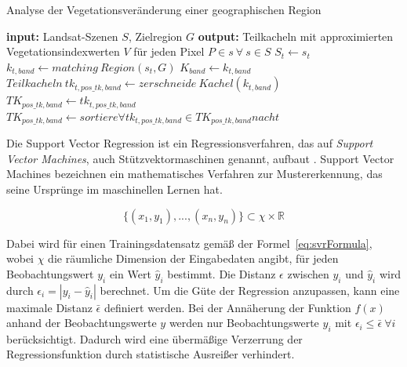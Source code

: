 \begin{algorithm}[H]
\small
\caption{Analyse der Vegetationsveränderung einer geographischen Region}
\label{alg:generalAlgorithm}
\begin{algorithmic}[1]
	\State \textbf{input:} Landsat-Szenen $S$, Zielregion $G$
	\State \textbf{output:} Teilkacheln mit approximierten Vegetationsindexwerten $V$ für jeden Pixel $P \in s\ \forall\ s \in S$
        		\State $S_t \leftarrow s_t $ \label{alg:groupOriginalScenes}
	\EndFor
	 \label{alg:dataCubeCreation}
			\State $k_{t, band} \leftarrow matching\ Region (s_t, G)$ \label{alg:cutAllTilesOfAGroup}
			\State $K_{band} \leftarrow k_{t, band}$ \label{alg:groupTiles}
		\EndFor
	\EndFor
	 \label{alg:flatMapOperator}
		\State $Teilkacheln\ tk_{t, pos\_tk, band} \leftarrow zerschneide\ Kachel (k_{t, band})$ \label{alg:sliceAllTiles}
		\State $TK_{pos\_tk, band} \leftarrow tk_{t, pos\_tk, band}$ \label{alg:groupSubscenes}
	\EndFor
		\State $TK_{pos\_tk, band} \leftarrow sortiere \forall tk_{t, pos\_tk, band} \in TK_{pos\_tk, band} nach t$ \label{alg:sortSubscenes}
		 \label{alg:createPixelTimeSeriesLoopStart}
				 \label{alg:createPixelTimeSeries}
			\EndFor
		\EndFor \label{alg:createPixelTimeSeriesLoopEnd}
			 \label{alg:approxPixelTimeSeries}
		\EndFor
	\EndFor
\EndFunction

\end{algorithmic}
\end{algorithm}


Die Support Vector Regression ist ein Regressionsverfahren, das auf \textit{Support Vector Machines}, auch Stützvektormaschinen genannt, aufbaut \cite{Drucker97}. Support Vector Machines bezeichnen ein mathematisches Verfahren zur Mustererkennung, das seine Ursprünge im maschinellen Lernen hat. 

\begin{equation} \label{eq:svrFormula}
\{{(x_1, y_1)},...,{(x_n, y_n)}\} \subset \chi \times \mathbb{R}
\end{equation}

Dabei wird für einen Trainingsdatensatz gemäß der Formel~\ref{eq:svrFormula}, wobei \(\chi\) die räumliche Dimension der Eingabedaten angibt, für jeden Beobachtungswert \(y_i \) ein Wert \( \hat{y}_i \) bestimmt. Die Distanz \( \epsilon \) zwischen \( y_i \) und \( \hat{y}_i \) wird durch \( \epsilon_i = | y_i - \hat{y}_i | \) berechnet. Um die Güte der Regression anzupassen, kann eine maximale Distanz $\bar{\epsilon}$ definiert werden. Bei der Annäherung der Funktion \(f(x) \) anhand der Beobachtungswerte $y$ werden nur Beobachtungswerte $y_i$ mit $\epsilon_i \leq \bar{\epsilon}\ \forall i$ berücksichtigt. Dadurch wird eine übermäßige Verzerrung der Regressionsfunktion durch statistische Ausreißer verhindert.

